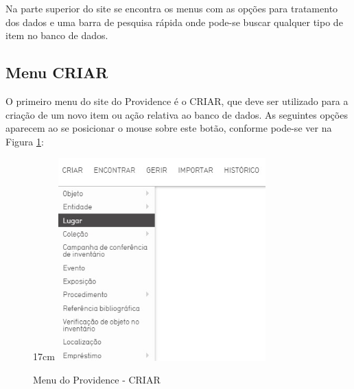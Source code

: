 \documentclass[a4paper,12pt,oneside,onecolumn,final,fleqn]{repUERJ}
\begin{document}
Na parte superior do site se encontra os menus com as opções para tratamento dos dados e uma barra de pesquisa rápida onde pode-se buscar qualquer tipo de item no banco de dados.

\subsection{Menu CRIAR}

O primeiro menu do site do Providence é o CRIAR, que deve ser utilizado para a criação de um novo item ou ação relativa ao banco de dados. As seguintes opções aparecem ao se posicionar o mouse sobre este botão, conforme pode-se ver na Figura \ref{fig:menu_criar}:

\begin{figure}[!ht]{17cm}
	\includegraphics[width=8cm, center]{figuras/menu_criar.jpg}
	\caption{Menu do Providence - CRIAR} \label{fig:menu_criar}
\end{figure}
\end{document}
